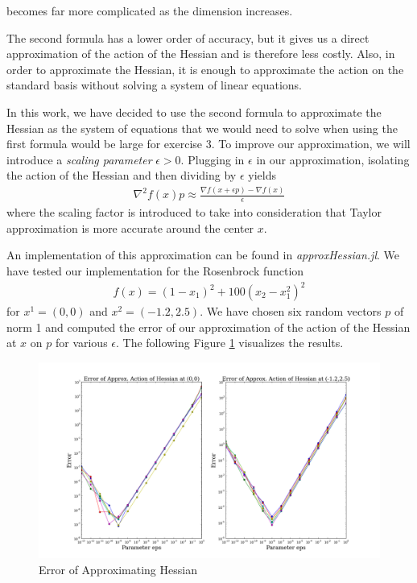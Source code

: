 \documentclass{article}
\begin{document}
becomes far more complicated as the dimension increases. \par
The second formula has a lower order of accuracy, but it gives us a direct approximation of the action of the Hessian and is therefore less costly. Also, in order to approximate the Hessian, it is enough to approximate the action on the
standard basis without solving a system of linear equations.\par
In this work, we have decided to use the second formula to approximate the Hessian as the system of equations that we would need to solve when using the first formula would be large for exercise 3. To improve our approximation, we will introduce a \emph{scaling parameter} $\epsilon>0$. Plugging in $\epsilon$ in our approximation, isolating the action of the Hessian and then dividing by $\epsilon$ yields
\begin{align*}
  \nabla^{2} f(x)p\approx\frac{\nabla f(x+\epsilon p)-\nabla f(x)}{\epsilon}
\end{align*}
where  the scaling factor is introduced to take into consideration that
Taylor approximation is more accurate around the center $x$. \par
An implementation of this approximation can be found in \emph{approxHessian.jl}.
We have tested our implementation for the Rosenbrock function
\begin{align*}
  f(x)=(1-x_1)^2+100(x_2-x_1^2)^2
\end{align*}
for $x^{1}=(0,0)$ and $x^{2}=(-1.2,2.5)$. We have chosen six random vectors $p$
of norm 1 and computed the error of our approximation of the action of the Hessian at $x$ on $p$ for various $\epsilon$. The following Figure \ref{action}
visualizes the results.
\begin{figure}[H]
  \centerline{
  \includegraphics[scale=0.3]{action.png}
  }
  \caption{Error of Approximating Hessian}
\label{action}
\end{figure}
\end{document}
